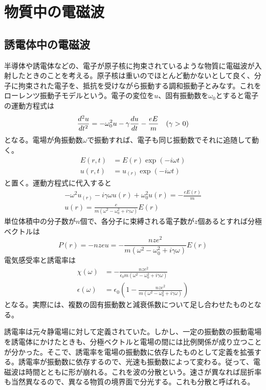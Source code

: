 \section{物質中の電磁波}

\subsection{誘電体中の電磁波}
    半導体や誘電体などの、電子が原子核に拘束されているような物質に電磁波が入射したときのことを考える。原子核は重いのでほとんど動かないとして良く、分子に拘束された電子を、抵抗を受けながら振動する調和振動子とみなす。これをローレンツ振動子モデルという。電子の変位を$u$、固有振動数を$\omega_0$とすると電子の運動方程式は
        \[\de[^2u]{t^2} = - \omega_0^2 u - \gamma\de[u]{t} -\frac{eE}{m} \quad (\gamma > 0)\]
    となる。電場が角振動数$\omega$で振動すれば、電子も同じ振動数でそれに追随して動く。
    \begin{align*}
        E(r, t) &= E(r)\exp(-i\omega t)\\
        u(r, t) &= u_(r)\exp(-i\omega t)
    \end{align*}
    と置く。運動方程式に代入すると
    \begin{gather*}
        -\omega^2 u_(r) - i\gamma\omega u(r) + \omega_0^2 u(r) = -\frac{eE(r)}{m}\\
        u(r) = \frac{e}{m(\omega^2 - \omega_0^2 + i\gamma\omega)}E(r)
    \end{gather*}
    単位体積中の分子数が$n$個で、各分子に束縛される電子数が$z$個あるとすれば分極ベクトルは
        \[P(r) = -nzeu = -\frac{nze^2}{m(\omega^2 - \omega_0^2 + i\gamma\omega)}E(r)\]
    電気感受率と誘電率は
    \begin{align*}
        \chi(\omega) &= -\frac{nze^2}{\epsilon_0m(\omega^2 - \omega_0^2 + i\gamma\omega)}\\
        \epsilon(\omega) &= \epsilon_0\left(1 - \frac{nze^2}{m(\omega^2 - \omega_0^2 + i\gamma\omega)}\right)
    \end{align*}
    となる。実際には、複数の固有振動数と減衰係数について足し合わせたものとなる。
    
    誘電率は元々静電場に対して定義されていた。しかし、一定の振動数の振動電場を誘電体にかけたときも、分極ベクトルと電場の間には比例関係が成り立つことが分かった。そこで、誘電率を電場の振動数に依存したものとして定義を拡張する。誘電率が振動数に依存するので、光速も振動数によって変わる。従って、電磁波は時間とともに形が崩れる。これを波の分散という。速さが異なれば屈折率も当然異なるので、異なる物質の境界面で分光する。これも分散と呼ばれる。
    

